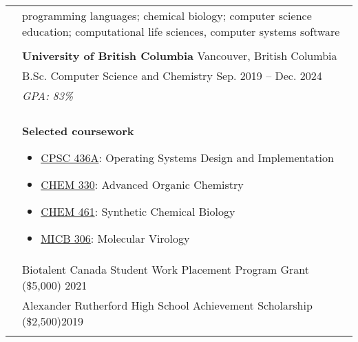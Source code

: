 \documentclass[letterpaper, 11pt]{article}
\begin{document}

\vspace{0.5cm} 


\setlength{\tabcolsep}{8pt}

\begin{longtable}{p{1.3in}p{4.8in}}

\nohyphens{\color{Blue}{Research Interests}}
& programming languages; chemical biology; computer science education; computational life sciences, computer systems software \\
& \\

\color{Blue}{Education} 
& \textbf{University of British Columbia} \hfill Vancouver, British Columbia \\
& B.Sc. Computer Science and Chemistry \hfill Sep. 2019 -- Dec. 2024 \\
& {\it GPA: 83\%} \\
& \\

& \textbf{Selected coursework}
\begin{itemize}[noitemsep,leftmargin=*]
\item \underline{CPSC 436A}: Operating Systems Design and Implementation
\item \underline{CHEM 330}: Advanced Organic Chemistry
\item \underline{CHEM 461}: Synthetic Chemical Biology
\item \underline{MICB 306}: Molecular Virology
\end{itemize} \\

{\color{Blue}{Honours and}} 
& Biotalent Canada Student Work Placement Program Grant (\$5,000) \hfill 2021\\
{\color{Blue}{Scholarships}} 
& Alexander Rutherford High School Achievement Scholarship (\$2,500)\hfill 2019 \\
& \\


\end{longtable}
\end{document}
